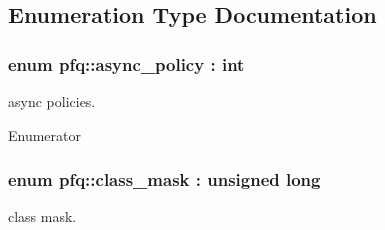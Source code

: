 \subsection{Enumeration Type Documentation}
\hypertarget{namespacepfq_a1746801a74eba08ffdc09e63ceef61b4}{
\subsubsection[{async\+\_\+policy}]{\setlength{\rightskip}{0pt plus 5cm}enum {\bf pfq\+::async\+\_\+policy} \+: int\hspace{0.3cm}{\ttfamily [strong]}}}\label{namespacepfq_a1746801a74eba08ffdc09e63ceef61b4}


async policies. 

\begin{Desc}
\item[Enumerator]\par
\begin{description}
\item[{\em 
\hypertarget{namespacepfq_a1746801a74eba08ffdc09e63ceef61b4aaac4195216fbbb11f455deff79f13e57}{tx\+\_\+deferred}\label{namespacepfq_a1746801a74eba08ffdc09e63ceef61b4aaac4195216fbbb11f455deff79f13e57}
}]\item[{\em 
\hypertarget{namespacepfq_a1746801a74eba08ffdc09e63ceef61b4a4bb5789fc0dc625ba948410d59ead775}{tx\+\_\+threaded}\label{namespacepfq_a1746801a74eba08ffdc09e63ceef61b4a4bb5789fc0dc625ba948410d59ead775}
}]\end{description}
\end{Desc}
\hypertarget{namespacepfq_a96af1f5ed530eff563eb917516758fbb}{
\subsubsection[{class\+\_\+mask}]{\setlength{\rightskip}{0pt plus 5cm}enum {\bf pfq\+::class\+\_\+mask} \+: unsigned long\hspace{0.3cm}{\ttfamily [strong]}}}\label{namespacepfq_a96af1f5ed530eff563eb917516758fbb}


class mask. 

